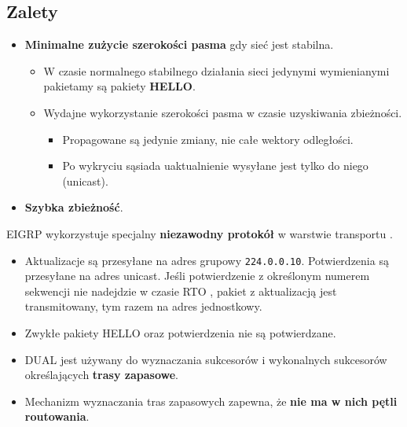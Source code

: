 \documentclass[../sk-egzamin.tex]{subfiles}
\begin{document}
\subsection*{Zalety}
\begin{itemize}
    \item \textbf{Minimalne zużycie szerokości pasma} gdy sieć jest stabilna.
    \begin{itemize}
        \item W czasie normalnego stabilnego działania sieci jedynymi
        wymienianymi pakietamy są pakiety \textbf{HELLO}.
        \item Wydajne wykorzystanie szerokości pasma w czasie uzyskiwania
        zbieżności.
        \begin{itemize}
            \item Propagowane są jedynie zmiany, nie całe wektory odległości.
            \item Po wykryciu sąsiada uaktualnienie wysyłane jest tylko do
            niego (unicast).
        \end{itemize}
    \end{itemize}
    \item \textbf{Szybka zbieżność}.
\end{itemize}

EIGRP wykorzystuje specjalny \textbf{niezawodny protokół} w warstwie transportu
.

\begin{itemize}
    \item Aktualizacje są przesyłane na adres grupowy \texttt{224.0.0.10}.
    Potwierdzenia są przesyłane na adres unicast.
    Jeśli potwierdzenie z określonym numerem sekwencji nie nadejdzie w czasie
    RTO , pakiet z aktualizacją jest
    transmitowany, tym razem na adres jednostkowy.

    \item Zwykłe pakiety HELLO oraz potwierdzenia nie są potwierdzane.

    \item DUAL jest używany do wyznaczania sukcesorów i wykonalnych sukcesorów
    określających \textbf{trasy zapasowe}.

    \item Mechanizm wyznaczania tras zapasowych zapewna, że
    \textbf{nie ma w nich pętli routowania}.
\end{itemize}


\pagebreak
\end{document}
